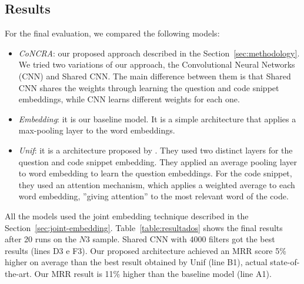 \documentclass[sigconf]{acmart}
\begin{document}
\subsection{Results}

For the final evaluation, we compared the following models:

\begin{itemize}
    \item \emph{CoNCRA}: our proposed approach described in the Section~\ref{sec:methodology}. We tried two variations of our approach, the Convolutional Neural Networks (CNN) and Shared CNN. The main difference between them is that Shared CNN shares the weights through learning the question and code snippet embeddings, while CNN learns different weights for each one.
    \item \emph{Embedding}: it is our baseline model. It is a simple architecture that applies a max-pooling layer to the word embeddings. 
    \item \emph{Unif}: it is a architecture proposed by \cite{cambronero-deep-code-search-2019}. They used two distinct layers for the question and code snippet embedding. They applied an average pooling layer to word embedding to learn the question embeddings. For the code snippet, they used an attention mechanism, which applies a weighted average to each word embedding, ''giving attention'' to the most relevant word of the code.
\end{itemize}

All the models used the joint embedding technique described in the Section~\ref{sec:joint-embedding}. Table~\ref{table:resultados} shows the final results after 20 runs on the $N3$ sample. Shared CNN with 4000 filters got the best results (lines D3 e F3). Our proposed architecture achieved an MRR score 5\% higher on average than the best result obtained by Unif (line B1), actual state-of-the-art. Our MRR result is 11\% higher than the baseline model (line A1). 
\end{document}
